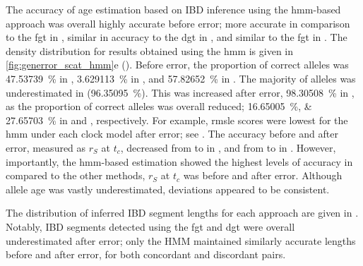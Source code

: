 The accuracy of age estimation based on IBD inference using the \gls{hmm}-based approach was overall highly accurate before error; more accurate in comparison to the \gls{fgt} in \ClockM, similar in accuracy to the \gls{dgt} in \ClockR, and similar to the \gls{fgt} in \ClockC.
The density distribution for results obtained using the \gls{hmm} is given in \cref{fig:generror_scat_hmm}{e} ().
Before error, the proportion of correct alleles was \SI{47.53739}{\percent} in \ClockM, \SI{3.629113}{\percent} in \ClockR, and \SI{57.82652}{\percent} in \ClockC.
The majority of alleles was underestimated in \ClockR (\SI{96.35095}{\percent}).
This was increased after error, \ie \SI{98.30508}{\percent} in \ClockR, as the proportion of correct alleles was overall reduced; \SIlist{16.65005;27.65703}{\percent} in \ClockM and \ClockC, respectively.
For example, \gls{rmsle} scores were lowest for the \gls{hmm} under each clock model after error; see .
The accuracy before and after error, measured as $r_S$ at $t_c$, decreased from  to  in \ClockM, and from  to  in \ClockC.
However, importantly, the \gls{hmm}-based estimation showed the highest levels of accuracy in \ClockR compared to the other methods, \ie $r_S$ at $t_c$ was  before and  after error.
Although allele age was vastly underestimated, deviations appeared to be consistent.

%

%

The distribution of inferred IBD segment lengths for each approach are given in .
Notably, IBD segments detected using the \gls{fgt} and \gls{dgt} were overall underestimated after error; only the HMM maintained similarly accurate lengths before and after error, for both concordant and discordant pairs.









